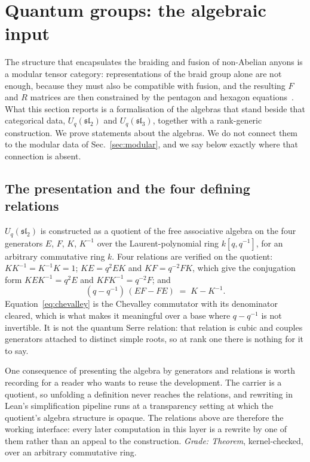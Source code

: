 \documentclass[aps,prx,nofootinbib,superscriptaddress,12pt]{revtex4-2}
\begin{document}
\section{Quantum groups: the algebraic input}
\label{sec:qgroups}

The structure that encapsulates the braiding and fusion of non-Abelian
anyons is a modular tensor category: representations of the braid group
alone are not enough, because they must also be compatible with fusion,
and the resulting $F$ and $R$ matrices are then constrained by the
pentagon and hexagon
equations~\cite[Sec.~III.A.2]{NayakSimonSternFreedmanDasSarma2008}. What
this section reports is a formalisation of the algebras that stand
beside that categorical data, $U_q(\mathfrak{sl}_2)$ and
$U_q(\mathfrak{sl}_3)$, together with a rank-generic construction. We
prove statements about the algebras. We do not connect them to the
modular data of Sec.~\ref{sec:modular}, and we say below exactly where
that connection is absent.

\subsection{The presentation and the four defining relations}

$U_q(\mathfrak{sl}_2)$ is constructed as a quotient of the free
associative algebra on the four generators $E$, $F$, $K$, $K^{-1}$ over
the Laurent-polynomial ring $k[q,q^{-1}]$, for an arbitrary commutative
ring $k$. Four relations are verified on the quotient:
$KK^{-1} = K^{-1}K = 1$; $KE = q^{2}EK$ and $KF = q^{-2}FK$, which give
the conjugation form $KEK^{-1} = q^{2}E$ and $KFK^{-1} = q^{-2}F$; and
\begin{equation}
(q - q^{-1})\,(EF - FE) \;=\; K - K^{-1}.
\label{eq:chevalley}
\end{equation}
Equation~\eqref{eq:chevalley} is the Chevalley commutator with its
denominator cleared, which is what makes it meaningful over a base where
$q - q^{-1}$ is not invertible. It is not the quantum Serre relation:
that relation is cubic and couples generators attached to distinct
simple roots, so at rank one there is nothing for it to say.

One consequence of presenting the algebra by generators and relations is
worth recording for a reader who wants to reuse the development. The
carrier is a quotient, so unfolding a definition never reaches the
relations, and rewriting in Lean's simplification pipeline runs at a
transparency setting at which the quotient's algebra structure is
opaque. The relations above are therefore the working interface: every
later computation in this layer is a rewrite by one of them rather than
an appeal to the construction. \emph{Grade: Theorem}, kernel-checked,
over an arbitrary commutative ring.
\end{document}
